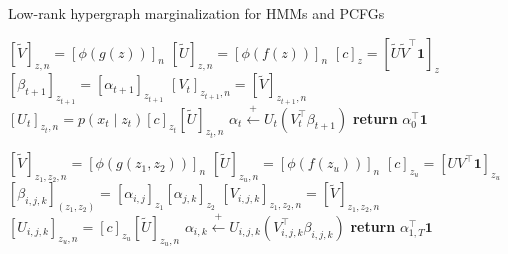 \documentclass{article}
\begin{document}
\begin{algorithm}[H]
\caption{Low-rank hypergraph marginalization for HMMs and PCFGs}
\label{alg:lr-marg-hmm-pcfg}
\begin{minipage}[t]{0.45\textwidth}
\begin{algorithmic}
\STATE $[\tilde{V}]_{z,n} = [\phi(g(z))]_n$
\STATE $[\tilde{U}]_{z,n} = [\phi(f(z))]_n$
\STATE $[c]_z = [\tilde{U}\tilde{V}^\top\mathbf{1}]_z$
\STATE $[\beta_{t+1}]_{z_{t+1}} = [\alpha_{t+1}]_{z_{t+1}}$
\STATE $[V_t]_{z_{t+1},n} = [\tilde{V}]_{z_{t+1},n}$
\STATE $[U_t]_{z_t,n} = p(x_t \mid z_t)[c]_{z_{t}}[\tilde{U}]_{z_t,n}$
\STATE $\alpha_t \stackrel{+}{\gets} U_t(V_t^\top\beta_{t+1})$
\ENDFOR
\STATE \textbf{return} $\alpha_0^\top \mathbf{1}$
\end{algorithmic}
\end{minipage}
\vspace{0pt}
\begin{minipage}[t]{0.50\textwidth}
\begin{algorithmic} 
\STATE $[\tilde{V}]_{z_1,z_2,n} = [\phi(g(z_1,z_2))]_n$
\STATE $[\tilde{U}]_{z_u,n} = [\phi(f(z_u))]_n$
\STATE $[c]_{z_u} = [UV^\top\mathbf{1}]_{z_u}$
\STATE $[\beta_{i,j,k}]_{(z_1,z_2)} = [\alpha_{i,j}]_{z_1}[\alpha_{j,k}]_{z_2}$
\STATE $[V_{i,j,k}]_{z_1,z_2,n} = [\tilde{V}]_{z_1,z_2,n}$
\STATE $[U_{i,j,k}]_{z_u,n} = [c]_{z_u}[\tilde{U}]_{z_u,n}$
\STATE $\alpha_{i,k} \stackrel{+}{\gets} U_{i,j,k}(V_{i,j,k}^\top\beta_{i,j,k})$
\ENDFOR
\STATE \textbf{return} $\alpha_{1,T}^\top \mathbf{1}$
\end{algorithmic}
\end{minipage}
\end{algorithm}
\end{document}
